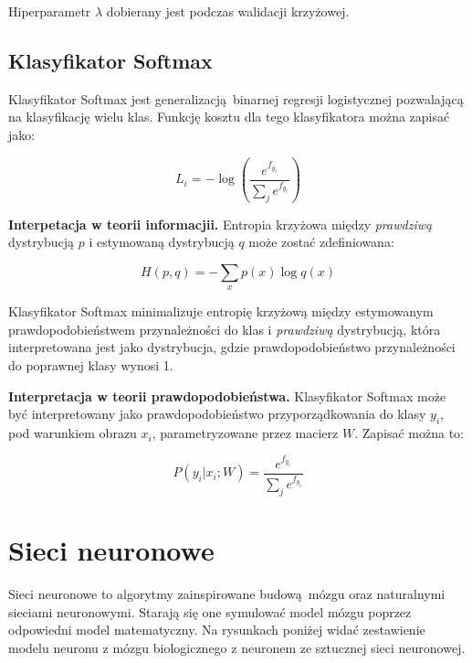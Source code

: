 \documentclass[a4paper,11pt, notitlepage, twosides, openany ]{report}
\begin{document}
	Hiperparametr $\lambda$ dobierany jest podczas walidacji krzyżowej. 

	\subsection{Klasyfikator Softmax}
	Klasyfikator Softmax jest generalizacją binarnej regresji logistycznej pozwalającą na klasyfikację wielu klas. Funkcję kosztu dla tego klasyfikatora można zapisać jako:

	$$
		L_i = -\log\left(\frac{e^{f_{y_i}}}{\sum_{j} e^{f_{y_i}}}\right)
	$$

	\textbf{Interpetacja w teorii informacjii.} Entropia krzyżowa między \textit{prawdziwą} dystrybucją $p$ i estymowaną dystrybucją $q$ może zostać zdefiniowana:

	$$
		H(p,q) = -\sum_{x}p(x)\log q(x)
	$$

	Klasyfikator Softmax minimalizuje entropię krzyżową między estymowanym prawdopodobieństwem przynależności do klas i \textit{prawdziwą} dystrybucją, która interpretowana jest jako dystrybucja, gdzie prawdopodobieństwo przynależności do poprawnej klasy wynosi 1.

	\textbf{Interpretacja w teorii prawdopodobieństwa.} Klasyfikator Softmax może być interpretowany jako prawdopodobieństwo przyporządkowania do klasy $y_i$, pod warunkiem obrazu $x_i$, parametryzowane przez macierz $W$. Zapisać można to:

	$$
		P(y_i|x_i;W)=\frac{e^{f_{y_i}}}{\sum_{j} e^{f_{y_i}}}
	$$

	\section{Sieci neuronowe}
	Sieci neuronowe to algorytmy zainspirowane budową mózgu oraz naturalnymi sieciami neuronowymi. Starają się one symulować model mózgu poprzez odpowiedni model matematyczny. Na rysunkach poniżej widać zestawienie modelu neuronu z mózgu biologicznego z neuronem ze sztucznej sieci neuronowej.
\end{document}
